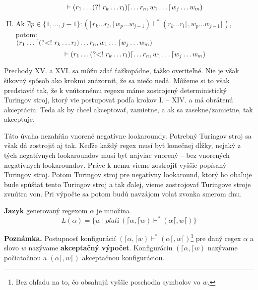 \begin{df}
\begin{enumerate}[I.]
$$\vdash (r_1\dots \text{(?!~} r_{k}\dots r_{l} ) \lceil\dots r_n, w_1\dots \lceil w_j \dots w_m)$$
\item Ak $\nexists p \in \lbrace 1,\dots,j-1\rbrace: (\lceil r_k\dots r_l,\lceil w_p\dots w_{j-1}) \vdash^* (r_k\dots r_l\lceil, w_p \dots w_{j-1} \lceil)$, potom:
\\$\displaystyle{(r_1\dots\lceil \text{(?\textless !~}r_{k}\dots r_{l} ) \dots r_n, w_1\dots \lceil w_j \dots w_m)}$
$$\vdash (r_1\dots \text{(?\textless !~} r_{k}\dots r_{l} ) \lceil\dots r_n, w_1\dots \lceil w_j \dots w_m)$$
\end{enumerate}

\end{df}

Prechody XV. a XVI. sa môžu zdať ťažkopádne, ťažko overiteľné. Nie je však šikovný spôsob ako krokmi znázorniť, že sa niečo nedá. Môžeme si to však predstaviť tak, že k vnútornému regexu máme zostrojený deterministický Turingov stroj, ktorý vie postupovať podľa krokov I. -- XIV. a má obrátenú akceptáciu. Teda ak by chcel akceptovať, zamietne, a ak sa zasekne/zamietne, tak akceptuje.

Táto úvaha nezahŕňa vnorené negatívne lookaroundy. Potrebný Turingov stroj sa však dá zostrojiť aj tak. Keďže každý regex musí byť konečnej dĺžky, nejaký z tých negatívnych lookaroundov musí byť najviac vnorený -- bez vnorených negatívnych lookaroundov. Práve k nemu vieme zostrojiť vyššie popísaný Turingov stroj. Potom Turingov stroj pre negatívny lookaround, ktorý ho obaľuje bude spúšťať tento Turingov stroj a tak ďalej, vieme zostrojovať Turingove stroje zvnútra von. Pri výpočte sa potom budú navzájom volať zvonka smerom dnu.

\begin{df}
\textbf{Jazyk} generovaný regexom $\alpha$ je množina $$L(\alpha) = \lbrace w~|~platí ~ (\lceil \alpha, \lceil w)\vdash^* (\alpha\lceil, w\lceil) \rbrace$$
\end{df}

\textbf{Poznámka.}
Postupnosť konfigurácií $(\lceil \alpha, \lceil w)\vdash^* (\alpha\lceil, w\lceil)$\footnote{Bez ohľadu na to, čo obsahujú vyššie poschodia symbolov vo $w$.} pre daný regex $\alpha$ a slovo $w$ nazývame \textbf{akceptačný výpočet}. Konfiguráciu $(\lceil \alpha,\lceil w)$ nazývame počiatočnou a $(\alpha\lceil,w\lceil)$ akceptačnou konfiguráciou.

